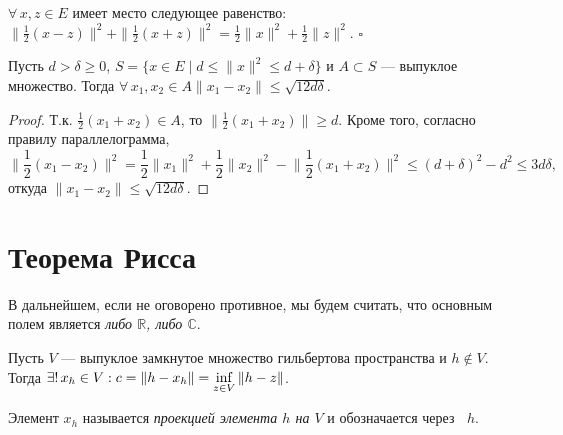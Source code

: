 \documentclass[10pt]{article}
\newcommand*{\p}[1]{#1\nobreak\discretionary{}{\hbox{$\mathsurround=0pt #1$}}{}}
\newcommand*{\pr}[1]{\mathop{\mathrm{pr_{#1}}}}
\begin{document}
\begin{lemma}
$\forall\,x,z\in E$ имеет место следующее равенство: $\|\frac 1
2(x-z)\|^2+\|\frac 1 2(x+z)\|^2= \frac 1 2\|x\|^2+\frac 1 2\|z\|^2$.
\hfill{$\square$}
\end{lemma}

\begin{lemma}\label{lemm.koltso}
Пусть $d>\delta\geqslant 0$, $S=\{x\in E\mid
d\leqslant\|x\|^2\leqslant d+\delta\}$ и $A\subset S$ --- выпуклое
множество. Тогда $\forall\,x_1,x_2\in A$\;\;$\|x_1-x_2\|\leqslant
\sqrt{12d\delta}$.
\end{lemma}

\enlargethispage{\baselineskip}

\begin{proof}
Т.к. $\frac 1 2(x_1+x_2)\in A$, то $\|\frac 1 2(x_1+x_2)\|\geqslant
d$. Кроме того, согласно правилу параллелограмма,
\begin{equation*}
\Big\|\frac 1 2(x_1-x_2)\Big\|^2=\frac 1 2\|x_1\|^2+\frac 1
2\|x_2\|^2-\Big\|\frac 1
2(x_1+x_2)\Big\|^2\leqslant(d+\delta)^2-d^2\leqslant3d\delta,
\end{equation*}
откуда $\|x_1-x_2\|\leqslant\sqrt{12d\delta}$.
\end{proof}



\vspace{-27pt}

\section{Теорема Рисса}

\begin{note}
В дальнейшем, если не оговорено противное, мы будем считать, что
основным полем является \emph{либо $\mathbb{R}$, либо $\mathbb{C}$}.
\end{note}

\begin{prop}
Пусть $V$ --- выпуклое замкнутое множество гильбертова пространства
и $h\not\in V$. Тогда $\exists!\,x_h\in
V:c=\|h-x_h\|\p=\inf\limits_{z\in V}\|h-z\|$.
\end{prop}

\begin{df}
Элемент $x_h$ называется \emph{проекцией элемента $h$ на $V$} и
обозначается через $\pr{V}h$.
\end{df}
\end{document}
